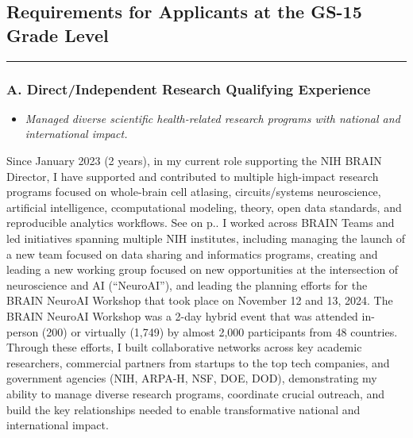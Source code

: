 \documentclass[10pt]{article}
\newcommand{\cf}[1]{\textcolor{hopkinsblue}{See \emph{\nameref{sec:#1}} on p.\pageref{sec:#1}}}
\begin{document}
\subsection*{Requirements for Applicants at the GS-15 Grade Level}
\vspace{-.1in}
\hrule
\vspace{.1in}
\subsubsection*{A. Direct/Independent Research Qualifying Experience}

\begin{itemize}
  \color{hopkinsblue}
  \item \emph{Managed diverse scientific health-related research programs with
national and international impact.}
\end{itemize}

Since January 2023 (2 years), in my current role supporting the NIH BRAIN
Director, I have supported and contributed to multiple high-impact research
programs focused on whole-brain cell atlasing, circuits/systems neuroscience,
artificial intelligence, ccomputational modeling, theory, open data standards,
and reproducible analytics workflows. \cf{jobobd}. I worked across BRAIN Teams
and led initiatives spanning multiple NIH institutes, including managing the
launch of a new team focused on data sharing and informatics programs, creating
and leading a new working group focused on new opportunities at the intersection
of neuroscience and AI (``NeuroAI''), and leading the planning efforts for the
BRAIN NeuroAI Workshop that took place on November 12 and 13, 2024. The BRAIN
NeuroAI Workshop was a 2-day hybrid event that was attended in-person (200)
or virtually (1,749) by almost 2,000 participants from 48 countries. Through
these efforts, I built collaborative networks across key academic researchers,
commercial partners from startups to the top tech companies, and government
agencies (NIH, ARPA-H, NSF, DOE, DOD), demonstrating my ability to manage
diverse research programs, coordinate crucial outreach, and build the key
relationships needed to enable transformative national and international impact.
\end{document}
